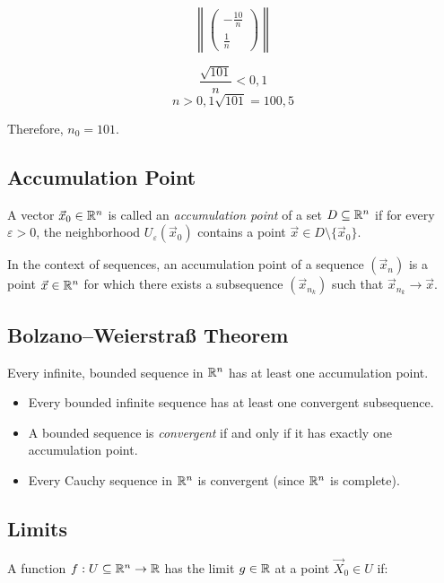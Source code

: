 \[
    \left\| 
    \begin{pmatrix}
        -\frac{10}{n}\\
        \frac{1}{n}
    \end{pmatrix}
    \right\|
\]

\[
    \frac{\sqrt{101}}{n} < 0,1
\]
\[
    n > 0,1 \sqrt{101} = 100,5
\]

Therefore, \(n_0 = 101\).

\subsection{Accumulation Point}

A vector \( \vec{x}_0 \in \mathbb{R}^n \) is called an \emph{accumulation point} of a set 
\( D \subseteq \mathbb{R}^n \) if for every \( \varepsilon > 0 \), the neighborhood 
\( U_\varepsilon(\vec{x}_0) \) contains a point \( \vec{x} \in D \setminus \{\vec{x}_0\} \).

In the context of sequences, an accumulation point of a sequence \( (\vec{x}_n) \) is a point 
\( \vec{x} \in \mathbb{R}^n \) for which there exists a subsequence \( (\vec{x}_{n_k}) \) such that 
\( \vec{x}_{n_k} \to \vec{x} \).

\subsection{Bolzano–Weierstraß Theorem}

Every infinite, bounded sequence in \( \mathbb{R}^n \) has at least one accumulation point.

\begin{itemize}
    
    \item Every bounded infinite sequence has at least one convergent subsequence.

    \item A bounded sequence is \emph{convergent} if and only if it has exactly one accumulation point.

    \item Every Cauchy sequence in \( \mathbb{R}^n \) is convergent (since \( \mathbb{R}^n \) is complete).

\end{itemize}

\subsection{Limits}

A function \( f : U \subseteq \mathbb{R}^n \to \mathbb{R} \) has the limit \( g \in \mathbb{R} \) at a 
point \( \vec{X}_0 \in U \) if:


